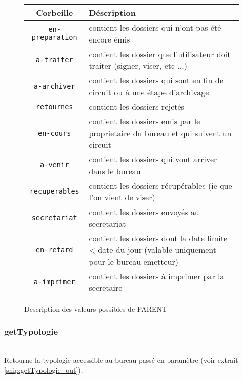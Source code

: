 \begin{figure}
\begin{center}
\begin{tabular}{c|p{7cm}}
	\hline
	Corbeille & Déscription \\
	\hline
        \verb|en-preparation| & contient les dossiers qui n'ont pas été encore émis  \\
        \verb|a-traiter| & contient les dossier que l'utilisateur doit traiter (signer, viser, etc ...) \\
        \verb|a-archiver| & contient les dossiers qui sont en fin de circuit ou à une étape d'archivage \\
        \verb|retournes| & contient les dossiers rejetés \\
        \verb|en-cours| & contient les dossiers emis par le proprietaire du bureau et qui suivent un circuit \\
        \verb|a-venir| & contient les dossiers qui vont arriver dans le bureau \\
        \verb|recuperables| & contient les dossiers récupérables (ie que l'on vient de viser) \\
        \verb|secretariat| & contient les dossiers envoyés au secretariat \\
        \verb|en-retard| & contient les dossiers dont la date limite < date du jour (valable uniquement pour le bureau emetteur) \\
        \verb|a-imprimer| & contient les dossiers à imprimer par la secretaire


\end{tabular}
\end{center}
\caption{Description des valeurs possibles de PARENT}
\label{table:parent_values}
\end{figure}




\subsubsection{getTypologie}
\\

Retourne la typologie accessible au bureau passé en paramètre (voir extrait \ref{snip:getTypologie_out}).

\begin{codesnippet}
\inputminted[frame=single,linenos,fontsize=\footnotesize]{javascript}{extraits/getTypologie_in.js}
\caption{getTypologie in}
\label{snip:getTypologie_in}
\end{codesnippet}







